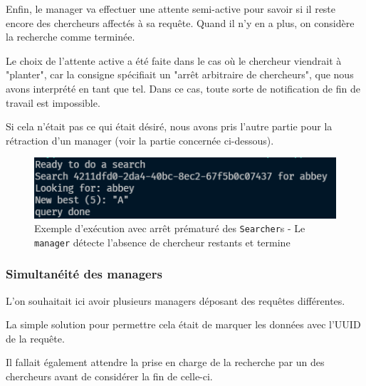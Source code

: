 \documentclass[headings=standardclasses,parskip=half]{scrartcl}
\begin{document}
Enfin, le manager va effectuer une attente semi-active pour savoir si il reste encore des chercheurs affectés à sa requête.
Quand il n'y en a plus, on considère la recherche comme terminée.

Le choix de l'attente active a été faite dans le cas où le chercheur viendrait à "planter", car la consigne spécifiait un
 "arrêt arbitraire de chercheurs", que nous avons interprété en tant que tel. Dans ce cas, toute sorte 
de notification de fin de travail est impossible. 

Si cela n'était pas ce qui était désiré, nous avons pris l'autre partie pour la rétraction d'un manager 
(voir la partie concernée ci-dessous).

\begin{figure}[h]
    \centering
    \includegraphics[scale=0.5]{arret-chercheurs.png}
    \caption{Exemple d'exécution avec arrêt prématuré des \texttt{Searcher}s - 
    Le \texttt{manager} détecte l'absence de chercheur restants et termine}
\end{figure}

\subsubsection{Simultanéité des managers}

L'on souhaitait ici avoir plusieurs managers déposant des requêtes différentes.

La simple solution pour permettre cela était de marquer les données avec l'UUID de la requête.

Il fallait également attendre la prise en charge de la recherche par un des chercheurs avant 
de considérer la fin de celle-ci.
\end{document}

